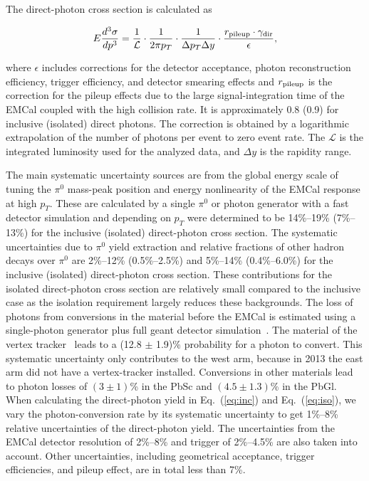 \documentclass[twocolumn,letterpaper,aps,prl,longbibliography,superscriptaddress,floatfix]{revtex4-2}
\newcommand{\pT}{\mbox{$p_T$}\xspace}
\newcommand{\pizero}{\mbox{$\pi^0$}\xspace}
\begin{document}

The direct-photon cross section is calculated as

\begin{equation} \label{eq:xsecex}
E\frac{d^3\sigma}{dp^3} = \frac{1}{\mathcal{L}} \cdot \frac{1}{2\pi p_T} \cdot \frac{1}{\Delta p_T \Delta y} \cdot \frac{r_{{\rm pileup}} \cdot \gamma_{{\rm dir}}}{\epsilon},
\end{equation}

\noindent where $\epsilon$ includes corrections for the detector acceptance, 
photon reconstruction efficiency, trigger efficiency, and detector 
smearing effects and $r_{{\rm pileup}}$ is the correction for the pileup 
effects due to the large signal-integration time of the EMCal coupled 
with the high collision rate. It is approximately 0.8 (0.9) for 
inclusive (isolated) direct photons. The correction is obtained by a 
logarithmic extrapolation of the number of photons per event to zero 
event rate. The $\mathcal{L}$ is the integrated luminosity used for the 
analyzed data, and $\Delta y$ is the rapidity range.

The main systematic uncertainty sources are from the global energy scale 
of tuning the \pizero mass-peak position and energy nonlinearity of the 
EMCal response at high \pT. These are calculated by a single \pizero or 
photon generator with a fast detector simulation and depending on \pT 
were determined to be 14\%--19\% (7\%--13\%) for the inclusive (isolated) 
direct-photon cross section. The systematic uncertainties due to \pizero 
yield extraction and relative fractions of other hadron decays over 
\pizero are 2\%--12\% (0.5\%--2.5\%) and 5\%--14\% (0.4\%--6.0\%) for 
the inclusive (isolated) direct-photon cross section. These 
contributions for the isolated direct-photon cross section are 
relatively small compared to the inclusive case as the isolation 
requirement largely reduces these backgrounds. The loss of photons from 
conversions in the material before the EMCal is estimated using a 
single-photon generator plus full {\sc geant} detector 
simulation~\cite{Brun:1994aa}. The material of the vertex 
tracker~\cite{SONDHEIM2012993} leads to a (12.8 $\pm$ 1.9)\% probability 
for a photon to convert. This systematic uncertainty only contributes to 
the west arm, because in 2013 the east arm did not have a vertex-tracker 
installed.  Conversions in other materials lead to photon losses of 
$(3{\pm}1)$\% in the PbSc and $(4.5{\pm}1.3)$\% in the PbGl.  When 
calculating the direct-photon yield in Eq.~(\ref{eq:inc}) and 
Eq.~(\ref{eq:iso}), we vary the photon-conversion rate by its systematic 
uncertainty to get 1\%--8\% relative uncertainties of the direct-photon 
yield. The uncertainties from the EMCal detector resolution of 2\%--8\% 
and trigger of 2\%--4.5\% are also taken into account. Other 
uncertainties, including geometrical acceptance, trigger efficiencies, 
and pileup effect, are in total less than 7\%.
\end{document}
